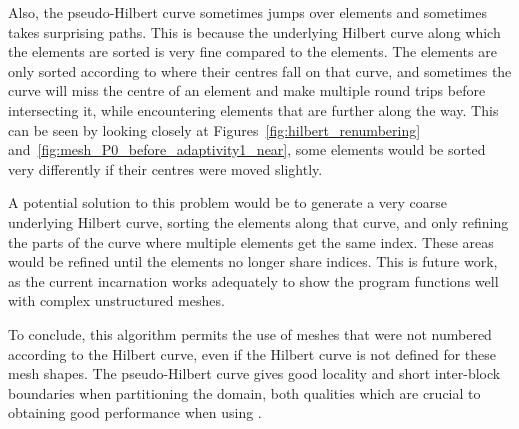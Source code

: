 Also, the pseudo-Hilbert curve sometimes jumps over elements and sometimes takes surprising paths.
This is because the underlying Hilbert curve along which the elements are sorted is very fine
compared to the elements. The elements are only sorted according to where their centres fall on that
curve, and sometimes the curve will miss the centre of an element and make multiple round trips
before intersecting it, while encountering elements that are further along the way. This can be seen
by looking closely at Figures~\ref{fig:hilbert_renumbering}
and~\ref{fig:mesh_P0_before_adaptivity1_near}, some elements would be sorted very differently if
their centres were moved slightly.

A potential solution to this problem would be to generate a very coarse underlying Hilbert curve,
sorting the elements along that curve, and only refining the parts of the curve where multiple
elements get the same index. These areas would be refined until the elements no longer share
indices. This is future work, as the current incarnation works adequately to show the program
functions well with complex unstructured meshes.

To conclude, this algorithm permits the use of meshes that were not numbered according to the
Hilbert curve, even if the Hilbert curve is not defined for these mesh shapes. The pseudo-Hilbert
curve gives good locality and short inter-block boundaries when partitioning the domain, both
qualities which are crucial to obtaining good performance when using .
